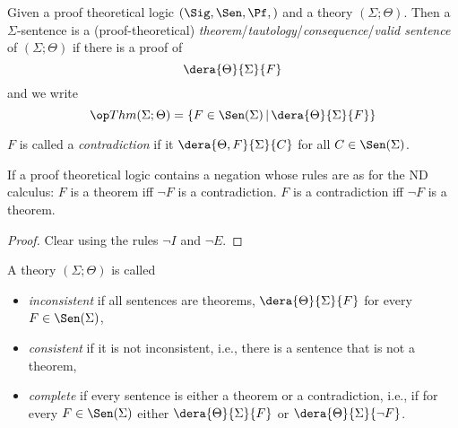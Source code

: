 \begin{definition}[Theorems]\label{def:pf:consequence}
Given a proof theoretical logic $(\Sig,\Sen,\Pf,\val)$ and a theory $(\Sigma;\Theta)$.
Then a $\Sigma$-sentence is a (proof-theoretical) \emph{theorem}/\emph{tautology}/\emph{consequence}/\emph{valid sentence} of $(\Sigma;\Theta)$ if there is a proof of
 \[\dera{\Theta}{\Sigma}{F}\]
and we write
 \[\Thm(\Sigma;\Theta)=\{F\in\Sen(\Sigma) \| \dera{\Theta}{\Sigma}{F}\}\]

$F$ is called a \emph{contradiction} if it $\dera{\Theta,F}{\Sigma}{C}$ for all $C\in\Sen(\Sigma)$.
\end{definition}

\begin{lemma}
If a proof theoretical logic contains a negation whose rules are as for the ND calculus:
$F$ is a theorem iff $\neg F$ is a contradiction. $F$ is a contradiction iff $\neg F$ is a theorem.
\end{lemma}
\begin{proof}
Clear using the rules $\neg I$ and $\neg E$.
\end{proof}

%
%

\begin{definition}\label{def:pf:consistent}
A theory $(\Sigma;\Theta)$ is called
\begin{itemize}
 \item \emph{inconsistent} if all sentences are theorems, $\dera{\Theta}{\Sigma}{F}$ for every $F\in\Sen(\Sigma)$,
 \item \emph{consistent} if it is not inconsistent, i.e., there is a sentence that is not a theorem,
 \item \emph{complete} if every sentence is either a theorem or a contradiction, i.e., if for every $F\in\Sen(\Sigma)$ either $\dera{\Theta}{\Sigma}{F}$ or $\dera{\Theta}{\Sigma}{\neg F}$.
\end{itemize}
\end{definition}

